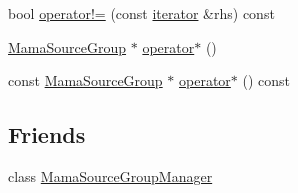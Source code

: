 \begin{DoxyCompactItemize}
\item 
bool \hyperlink{classWombat_1_1MamaSourceGroupManager_1_1iterator_a4829e8532893ced05b1c2eea27db2a92}{operator!=} (const \hyperlink{classWombat_1_1MamaSourceGroupManager_1_1iterator}{iterator} \&rhs) const 
\item 
\hyperlink{classWombat_1_1MamaSourceGroup}{MamaSourceGroup} $\ast$ \hyperlink{classWombat_1_1MamaSourceGroupManager_1_1iterator_a84bbb4f49ae7aa2a2ecfc10681d56e92}{operator$\ast$} ()
\item 
const \hyperlink{classWombat_1_1MamaSourceGroup}{MamaSourceGroup} $\ast$ \hyperlink{classWombat_1_1MamaSourceGroupManager_1_1iterator_aa25f6d94c654308efab982d718b44477}{operator$\ast$} () const 
\end{DoxyCompactItemize}
\subsection*{Friends}
\begin{DoxyCompactItemize}
\item 
class \hyperlink{classWombat_1_1MamaSourceGroupManager_1_1iterator_aeb3d82538bd958e8ad17c0aec0ea7810}{MamaSourceGroupManager}
\end{DoxyCompactItemize}


